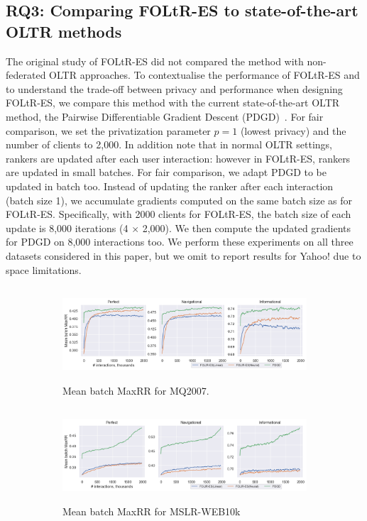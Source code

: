 \subsection{RQ3: Comparing FOLtR-ES to state-of-the-art OLTR methods}
The original study of FOLtR-ES did not compared the method with non-federated OLTR approaches. To contextualise the performance of FOLtR-ES and to understand the trade-off between privacy and performance when designing FOLtR-ES, we compare this method with the current state-of-the-art OLTR method, the Pairwise Differentiable Gradient Descent (PDGD)~\cite{oosterhuis2018differentiable}. For fair comparison, we set the privatization parameter $p=1$ (lowest privacy) and the number of clients to 2,000. In addition note that in normal OLTR settings, rankers are updated after each user interaction: however in FOLtR-ES, rankers are updated in small batches. For fair comparison, we adapt PDGD to be updated in batch too. Instead of updating the ranker after each interaction (batch size 1), we accumulate gradients computed on the same batch size as for FOLtR-ES. Specifically, with 2000 clients for FOLtR-ES, the batch size of each update is 8,000 iterations (4 $\times$ 2,000). We then compute the updated gradients for PDGD on 8,000 interactions too. %
We perform these experiments on all three datasets considered in this paper, but we omit to report results for Yahoo! due to space limitations. 

\begin{figure}[t]
	\centering
	\begin{subfigure}{1\textwidth}
		\includegraphics[width=13cm, height=3.5cm]{images/RQ3/mq2007_foltr_PDGD_mrr_c2000_p1.0.png}
		\caption{Mean batch MaxRR for MQ2007.}
		\label{fig:mq2007-rq3}
	\end{subfigure}
	\begin{subfigure}{1\textwidth}
		\includegraphics[width=13cm, height=3.5cm]{images/RQ3/mslr10k_foltr_PDGD_mrr_c2000_p1.0.png}
		\caption{Mean batch MaxRR for MSLR-WEB10k}
		\label{fig:mslr10k-rq3}
	\end{subfigure}
	\caption{{\color{red}{Results for RQ3: performance of FOLtR-ES and PDGD across datasets with privatization parameter $p=1$ and 2,000 clients (averaged across all dataset splits).}} \label{fig:RQ3}} 
\end{figure}

